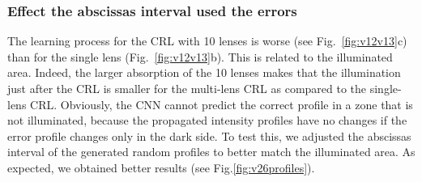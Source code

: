 \documentclass[preprint]{iucr}
\begin{document}
\subsubsection{Effect the abscissas interval used the errors}
The learning process for the CRL with 10 lenses is worse (see Fig.~\ref{fig:v12v13}c) than for the single lens (Fig.~\ref{fig:v12v13}b). This is related to the illuminated area. Indeed, the larger absorption of the 10 lenses makes that the illumination just after the CRL is smaller for the multi-lens CRL as compared to the single-lens CRL. Obviously, the CNN cannot predict the correct profile in a zone that is not illuminated, because the propagated intensity profiles have no changes if the error profile changes only in the dark side. To test this, we adjusted the abscissas interval of the generated random profiles to better match the illuminated area. As expected, we obtained better results (see Fig.\ref{fig:v26profiles}).
\end{document}

